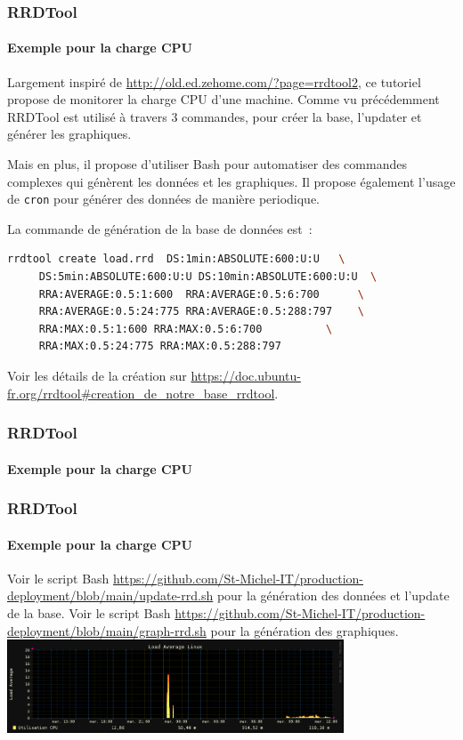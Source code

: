 \documentclass{beamer}
\begin{document}
    \begin{frame}[fragile]
        \transdissolve
        \frametitle{RRDTool}
        \framesubtitle{Exemple pour la charge CPU}
        Largement inspiré de \url{http://old.ed.zehome.com/?page=rrdtool2}, ce tutoriel propose de monitorer la charge CPU d'une machine.
        \bigbreak
        Comme vu précédemment RRDTool est utilisé à travers 3 commandes, pour créer la base, l'updater et générer les graphiques.

        Mais en plus, il propose d'utiliser Bash pour automatiser des commandes complexes qui génèrent les données et les graphiques.
        Il propose également l'usage de \lstinline{cron} pour générer des données de manière periodique.

        La commande de génération de la base de données est~:
        \begin{lstlisting}[language=bash,basicstyle=\ttfamily\tiny]
rrdtool create load.rrd  DS:1min:ABSOLUTE:600:U:U   \
     DS:5min:ABSOLUTE:600:U:U DS:10min:ABSOLUTE:600:U:U  \
     RRA:AVERAGE:0.5:1:600  RRA:AVERAGE:0.5:6:700      \
     RRA:AVERAGE:0.5:24:775 RRA:AVERAGE:0.5:288:797    \
     RRA:MAX:0.5:1:600 RRA:MAX:0.5:6:700          \
     RRA:MAX:0.5:24:775 RRA:MAX:0.5:288:797
        \end{lstlisting}
        Voir les détails de la création sur \url{https://doc.ubuntu-fr.org/rrdtool#creation_de_notre_base_rrdtool}.
    \end{frame}

    \begin{frame}[fragile]
        \transdissolve
        \frametitle{RRDTool}
        \framesubtitle{Exemple pour la charge CPU}
    \end{frame}

    \begin{frame}
        \transdissolve
        \frametitle{RRDTool}
        \framesubtitle{Exemple pour la charge CPU}
        Voir le script Bash \url{https://github.com/St-Michel-IT/production-deployment/blob/main/update-rrd.sh} pour la génération des données et l'update de la base.
        \bigbreak
        Voir le script Bash \url{https://github.com/St-Michel-IT/production-deployment/blob/main/graph-rrd.sh} pour la génération des graphiques.
        \bigbreak
        \centering
        \includegraphics[width=10cm]{image/../../load.equinoxe-day}
    \end{frame}
\end{document}
